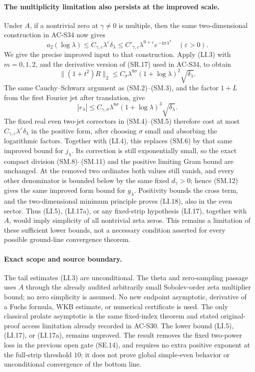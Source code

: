 \paragraph{The multiplicity limitation also persists at the improved scale.}
Under \(A\), if a nontrivial zero at \(\gamma\ne0\) is multiple,
then the same two-dimensional construction in AC-S34 now gives
\[
 a_2(\log\lambda)\le
        C_{\gamma,\varepsilon}\lambda^\varepsilon\delta_\lambda
      \le C'_{\gamma,\varepsilon}
                  \lambda^{9+\varepsilon}e^{-4\pi\lambda^2}
                         \quad(\varepsilon>0).
 \tag{LI.18}
\]
We give the precise improved input to that construction.  Apply
(LI.3) with \(m=0,1,2\), and the derivative version of (SR.17)
used in AC-S34, to obtain
\[
       \|(1+t^2)R\|_2
          \le C_\sigma\lambda^{8\sigma}
                      (1+\log\lambda)^2\sqrt{\delta_\lambda}.
\]
The same Cauchy--Schwarz argument as (SM.2)--(SM.3), and the factor
\(1+L\) from the first Fourier jet after translation, give
\[
       |e_\lambda|
          \le C_{\gamma,\sigma}\lambda^{8\sigma}
                      (1+\log\lambda)^3\sqrt{\delta_\lambda}.
\]
The fixed real even two-jet correctors in (SM.4)--(SM.5) therefore
cost at most \(C_{\gamma,\varepsilon}\lambda^\varepsilon
\delta_\lambda\) in the positive form, after choosing \(\sigma\)
small and absorbing the logarithmic factors.  Together with (LI.4),
this replaces (SM.6) by that same improved bound for \(j_\lambda\).
Its correction is still exponentially small, so the exact compact
division (SM.8)--(SM.11) and the positive limiting Gram bound are
unchanged.  At the removed two ordinates both values still vanish,
and every other denominator is bounded below by the same fixed
\(d_\gamma>0\); hence (SM.12) gives the same improved form bound
for \(g_\lambda\).  Positivity bounds the cross term, and the
two-dimensional minimum principle proves (LI.18), also in the
even sector.  Thus (LI.5), (LI.17a), or any fixed-strip hypothesis (LI.17),
together with \(A\), would imply simplicity of all nontrivial
zeta zeros.  This remains a limitation of these sufficient lower
bounds, not a necessary condition asserted for every possible
ground-line convergence theorem.

\paragraph{Exact scope and source boundary.}
The tail estimates (LI.3) are unconditional.  The theta and zero-sampling
passage uses \(A\) through the already audited arbitrarily small
Sobolev-order zeta multiplier bound; no zero simplicity is assumed.
No new endpoint asymptotic, derivative of a Fuchs formula, WKB
estimate, or numerical certificate is used.  The only classical
prolate asymptotic is the same fixed-index theorem and stated
original-proof access limitation already recorded in AC-S30.
The lower bound (LI.5), (LI.17), or (LI.17a), remains unproved.
The result removes the fixed two-power loss in the previous open
gate (SE.14), and requires no extra positive exponent at the
full-strip threshold \(10\); it does not prove global
simple-even behavior or unconditional convergence of the bottom line.


